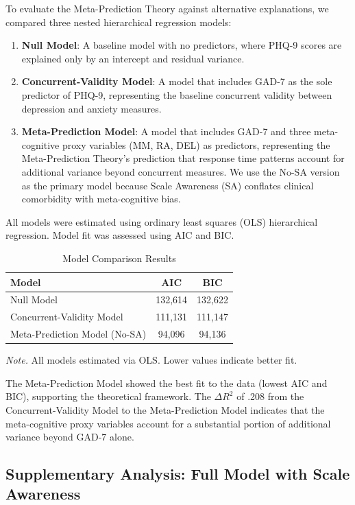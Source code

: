 \documentclass[10pt,twocolumn]{article}
\begin{document}
To evaluate the Meta-Prediction Theory against alternative explanations, we compared three nested hierarchical regression models:

\begin{enumerate}
    \item \textbf{Null Model}: A baseline model with no predictors, where PHQ-9 scores are explained only by an intercept and residual variance.
    \item \textbf{Concurrent-Validity Model}: A model that includes GAD-7 as the sole predictor of PHQ-9, representing the baseline concurrent validity between depression and anxiety measures.
    \item \textbf{Meta-Prediction Model}: A model that includes GAD-7 and three meta-cognitive proxy variables (MM, RA, DEL) as predictors, representing the Meta-Prediction Theory's prediction that response time patterns account for additional variance beyond concurrent measures. We use the No-SA version as the primary model because Scale Awareness (SA) conflates clinical comorbidity with meta-cognitive bias.
\end{enumerate}

All models were estimated using ordinary least squares (OLS) hierarchical regression. Model fit was assessed using AIC and BIC. \begin{table}[t]
\centering
\caption{Model Comparison Results}
\label{tab:model_comparison}
\footnotesize
\begin{tabular}{@{}lcc@{}}
\toprule
\textbf{Model} & \textbf{AIC} & \textbf{BIC} \\
\midrule
Null Model & 132,614 & 132,622 \\
Concurrent-Validity Model & 111,131 & 111,147 \\
Meta-Prediction Model (No-SA) & 94,096 & 94,136 \\
\bottomrule
\end{tabular}
\smallskip
\footnotesize \textit{Note.} All models estimated via OLS. Lower values indicate better fit.
\end{table}

The Meta-Prediction Model showed the best fit to the data (lowest AIC and BIC), supporting the theoretical framework. The $\Delta R^2$ of .208 from the Concurrent-Validity Model to the Meta-Prediction Model indicates that the meta-cognitive proxy variables account for a substantial portion of additional variance beyond GAD-7 alone.

\subsection{Supplementary Analysis: Full Model with Scale Awareness}
\end{document}
